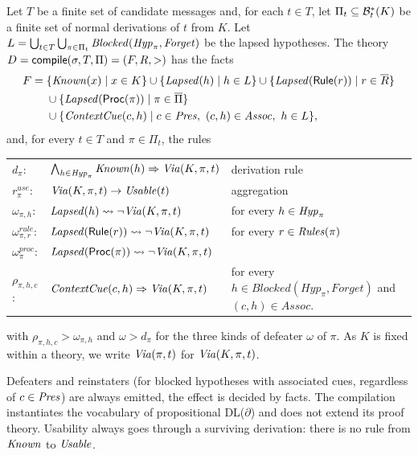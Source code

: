 \begin{definition}\label{def:compile}
Let $T$ be a finite set of candidate messages and, for each $t\in T$, let $\Pi_t\subseteq\mathcal{B}^*_t(K)$ be a finite set of normal derivations of $t$ from $K$. Let $L=\bigcup_{t\in T}\bigcup_{\pi\in\Pi_t}\mathit{Blocked}(\mathit{Hyp}_\pi,\mathit{Forget})$ be the lapsed hypotheses. The theory $D=\mathsf{compile}(\sigma,T,\Pi)=(F,R,>)$ has the facts
\begin{align*}
F={}&\{\mathit{Known}(x)\mid x\in K\}\cup\{\mathit{Lapsed}(h)\mid h\in L\}\cup\{\mathit{Lapsed}(\mathsf{Rule}(r))\mid r\in\overline{R}\}\\
&\cup\{\mathit{Lapsed}(\mathsf{Proc}(\pi))\mid\pi\in\overline{\Pi}\}\\
&\cup\{\mathit{ContextCue}(c,h)\mid c\in\mathit{Pres},\ (c,h)\in\mathit{Assoc},\ h\in L\},
\end{align*}
and, for every $t\in T$ and $\pi\in\Pi_t$, the rules
\begin{center}\footnotesize
\begin{tabular}{@{}lll@{}}
$d_\pi$: & $\bigwedge_{h\in\mathit{Hyp}_\pi}\mathit{Known}(h)\Rightarrow\mathit{Via}(K,\pi,t)$ & derivation rule \\
$r^{\mathit{use}}_{\pi}$: & $\mathit{Via}(K,\pi,t)\rightarrow\mathit{Usable}(t)$ & aggregation \\
$\omega_{\pi,h}$: & $\mathit{Lapsed}(h)\leadsto\neg\mathit{Via}(K,\pi,t)$ & for every $h\in\mathit{Hyp}_\pi$ \\
$\omega^{\mathit{rule}}_{\pi,r}$: & $\mathit{Lapsed}(\mathsf{Rule}(r))\leadsto\neg\mathit{Via}(K,\pi,t)$ & for every $r\in\mathit{Rules}(\pi)$ \\
$\omega^{\mathit{proc}}_{\pi}$: & $\mathit{Lapsed}(\mathsf{Proc}(\pi))\leadsto\neg\mathit{Via}(K,\pi,t)$ & \\
$\rho_{\pi,h,c}$: & $\mathit{ContextCue}(c,h)\Rightarrow\mathit{Via}(K,\pi,t)$ & for every $h \in \mathit{Blocked}(\mathit{Hyp}_\pi, \mathit{Forget})$ and $(c, h) \in \mathit{Assoc}$.
\end{tabular}
\end{center}
with $\rho_{\pi,h,c}>\omega_{\pi,h}$ and $\omega>d_\pi$ for the three kinds of defeater $\omega$ of $\pi$. As $K$ is fixed within a theory, we write $\mathit{Via}(\pi,t)$ for $\mathit{Via}(K,\pi,t)$.
\end{definition}

Defeaters and reinstaters (for blocked hypotheses with associated cues, regardless of $c \in \mathit{Pres}$) are always emitted, the effect is decided by facts. The compilation instantiates the vocabulary of propositional DL($\partial$) and does not extend its proof theory. Usability always goes through a surviving derivation: there is no rule from $\mathit{Known}$ to $\mathit{Usable}$.

